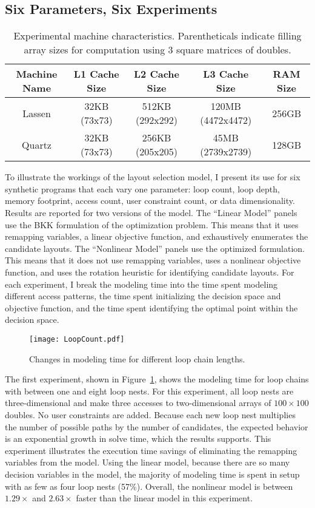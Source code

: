 \subsection{Six Parameters, Six Experiments}\label{sec:modelExperiments}

\begin{table}[t]
\begin{tabular}{|c|c|c|c|c|}
\hline
\textbf{Machine Name} & \textbf{L1 Cache Size} & \textbf{L2 Cache Size} & \textbf{L3 Cache Size} & \textbf{RAM Size} \\
\hline 
Lassen & 32KB (73x73) & 512KB (292x292) & 120MB (4472x4472) & 256GB \\
\hline
Quartz & 32KB (73x73) & 256KB (205x205) & 45MB (2739x2739) & 128GB \\
\hline
\end{tabular}
\caption{Experimental machine characteristics. Parentheticals indicate filling array sizes for computation using 3 square matrices of doubles.}\label{machineDetails}
\end{table}


To illustrate the workings of the layout selection model, I present its use for six synthetic programs that each vary one parameter: loop count, loop depth, memory footprint, access count, user constraint count, or data dimensionality.
Results are reported for two versions of the model.
The ``Linear Model'' panels use the BKK formulation of the optimization problem.
This means that it uses remapping variables, a linear objective function, and exhaustively enumerates the candidate layouts.
The ``Nonlinear Model'' panels use the optimized \FormatDecisions{} formulation.
This means that it does not use remapping variables, uses a nonlinear objective function, and uses the rotation heuristic for identifying candidate layouts.
For each experiment, I break the modeling time into the time spent modeling different access patterns, the time spent initializing the decision space and objective function, and the time spent identifying the optimal point within the decision space. 

\begin{figure}
\texttt{[image: LoopCount.pdf]}
\caption{Changes in modeling time for different loop chain lengths.}\label{LoopCount}
\end{figure}
The first experiment, shown in Figure~\ref{LoopCount}, shows the modeling time for loop chains with between one and eight loop nests.
For this experiment, all loop nests are three-dimensional and make three accesses to two-dimensional arrays of $100\times100$ doubles. 
No user constraints are added.
Because each new loop nest multiplies the number of possible paths by the number of candidates, the expected behavior is an exponential growth in solve time, which the results supports.
This experiment illustrates the execution time savings of eliminating the remapping variables from the model.
Using the linear model, because there are so many decision variables in the model, the majority of modeling time is spent in setup with as few as four loop nests (57\%).
Overall, the nonlinear model is between $1.29\times$ and $2.63\times$ faster than the linear model in this experiment.

